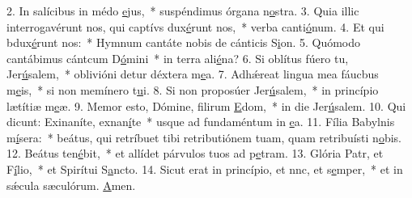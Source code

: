 2. In salícibus in médo \uline{e}jus,~* suspéndimus órgana n\uline{o}stra.
3. Quia illic interrogavérunt nos, qui captívs dux\uline{é}runt nos,~* verba canti\uline{ó}num.
4. Et qui bdux\uline{é}runt nos:~* Hymnum cantáte nobis de cánticis S\uline{i}on.
5. Quómodo cantábimus cántcum D\uline{ó}mini~* in terra ali\uline{é}na?
6. Si oblítus fúero tu, Jer\uline{ú}salem,~* oblivióni detur déxtera m\uline{e}a.
7. Adhǽreat lingua mea fáucbus m\uline{e}is,~* si non memínero t\uline{u}i.
8. Si non proposúer Jer\uline{ú}salem,~* in princípio lætítiæ m\uline{e}æ.
9. Memor esto, Dómine, filirum \uline{E}dom,~* in die Jer\uline{ú}salem.
10. Qui dicunt: Exinaníte, exnan\uline{í}te~* usque ad fundaméntum in \uline{e}a.
11. Fília Babylnis m\uline{í}sera:~* beátus, qui retríbuet tibi retributiónem tuam, quam retribuísti n\uline{o}bis.
12. Beátus  ten\uline{é}bit,~* et allídet párvulos tuos ad p\uline{e}tram.
13. Glória Patr, et F\uline{í}lio,~* et Spirítui S\uline{a}ncto.
14. Sicut erat in princípio, et nnc, et s\uline{e}mper,~* et in sǽcula sæculórum. \uline{A}men.

